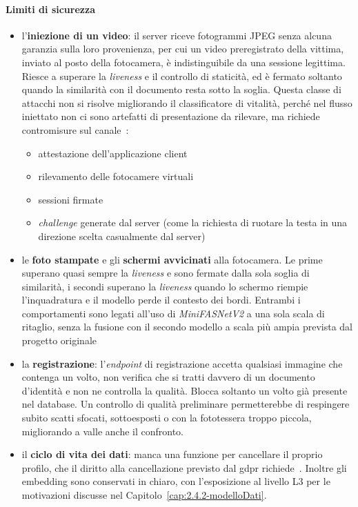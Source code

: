 \paragraph{Limiti di sicurezza}
\begin{itemize}
    \item l'\textbf{iniezione di un video}: il server riceve fotogrammi JPEG senza alcuna garanzia sulla loro provenienza, per cui un video preregistrato della vittima, inviato al posto della fotocamera, è indistinguibile da una sessione legittima. Riesce a superare la \textit{liveness} e il controllo di staticità, ed è fermato soltanto quando la similarità con il documento resta sotto la soglia.
    Questa classe di attacchi non si risolve migliorando il classificatore di vitalità, perché nel flusso iniettato non ci sono artefatti di presentazione da rilevare, ma richiede contromisure sul canale~\cite{groupBiometricLivenessPresentation}:
    \begin{itemize}
        \item attestazione dell'applicazione client
        \item rilevamento delle fotocamere virtuali
        \item sessioni firmate
        \item \textit{challenge} generate dal server (come la richiesta di ruotare la testa in una direzione scelta casualmente dal server)
    \end{itemize}
    \item le \textbf{foto stampate} e gli \textbf{schermi avvicinati} alla fotocamera. Le prime superano quasi sempre la \textit{liveness} e sono fermate dalla sola soglia di similarità, i secondi superano la \textit{liveness} quando lo schermo riempie l'inquadratura e il modello perde il contesto dei bordi.
    Entrambi i comportamenti sono legati all'uso di \textit{MiniFASNetV2} a una sola scala di ritaglio, senza la fusione con il secondo modello a scala più ampia prevista dal progetto originale~\cite{MinivisionaiSilentFaceAntiSpoofing}
    \item la \textbf{registrazione}: l'\textit{endpoint} di registrazione accetta qualsiasi immagine che contenga un volto, non verifica che si tratti davvero di un documento d'identità e non ne controlla la qualità. Blocca soltanto un volto già presente nel database.
    Un controllo di qualità preliminare permetterebbe di respingere subito scatti sfocati, sottoesposti o con la fototessera troppo piccola, migliorando a valle anche il confronto.
    \item il \textbf{ciclo di vita dei dati}: manca una funzione per cancellare il proprio profilo, che il diritto alla cancellazione previsto dal \gls{gdpr} richiede~\cite{REGOLAMENTOUE2016}. Inoltre gli embedding sono conservati in chiaro, con l'esposizione al livello L3 per le motivazioni discusse nel Capitolo~\ref{cap:2.4.2-modelloDati}.

\end{itemize}
